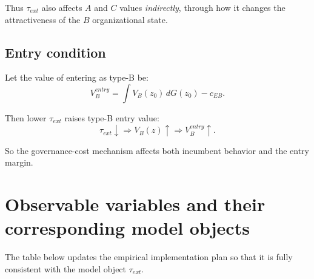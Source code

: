 \documentclass[12pt]{article}
\begin{document}
Thus \(\tau_{ext}\) also affects \(A\) and \(C\) values \emph{indirectly}, through how it changes
the attractiveness of the \(B\) organizational state.

\subsection{Entry condition}

Let the value of entering as type-B be:
\[
V_B^{entry}
=
\int V_B(z_0)\,dG(z_0)-c_{EB}.
\]

Then lower \(\tau_{ext}\) raises type-B entry value:
\[
\tau_{ext}\downarrow
\Rightarrow
V_B(z)\uparrow
\Rightarrow
V_B^{entry}\uparrow.
\]

So the governance-cost mechanism affects both incumbent behavior and the entry margin.

\section{Observable variables and their corresponding model objects}

The table below updates the empirical implementation plan so that it is fully consistent
with the model object \(\tau_{ext}\).
\end{document}
